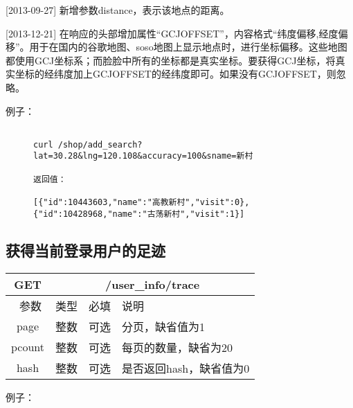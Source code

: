 \documentclass[cs4size]{ctexartutf8}
\begin{document}
[2013-09-27] 新增参数distance，表示该地点的距离。

[2013-12-21] 在响应的头部增加属性“GCJOFFSET”，内容格式“纬度偏移,经度偏移”。用于在国内的谷歌地图、soso地图上显示地点时，进行坐标偏移。这些地图都使用GCJ坐标系；而脸脸中所有的坐标都是真实坐标。要获得GCJ坐标，将真实坐标的经纬度加上GCJOFFSET的经纬度即可。如果没有GCJOFFSET，则忽略。

例子：

\begin{figure}[H]
\begin{verbatim}

curl /shop/add_search?lat=30.28&lng=120.108&accuracy=100&sname=新村

返回值：

[{"id":10443603,"name":"高教新村","visit":0},{"id":10428968,"name":"古荡新村","visit":1}]

\end{verbatim}
\end{figure}


\subsection{获得当前登录用户的足迹}

\begin{table}[H]
   \begin{center}
\begin{tabular}{|c|c|c|p{12cm}|}
\hline
GET & \multicolumn{3}{|c|}{/user\_info/trace} \\
\hline\hline
 \  参数  & 类型 & 必填 &  说明  \\
   \hline
 page  & 整数 & 可选 & 分页，缺省值为1\\ 
 \hline
 pcount  & 整数 & 可选 & 每页的数量，缺省为20\\ 
  \hline
 hash  & 整数 & 可选 & 是否返回hash，缺省值为0\\
 \hline
\end{tabular}
   \end{center}
\end{table}

例子：
\end{document}
